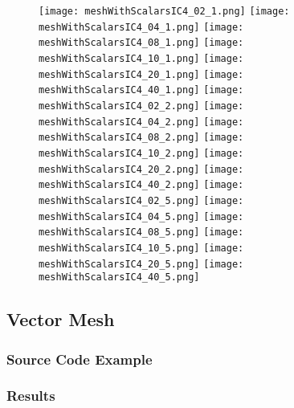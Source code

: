 \documentclass{InsightArticle}
\begin{document}
\begin{figure}
\center
\texttt{[image: meshWithScalarsIC4\_02\_1.png]}
\texttt{[image: meshWithScalarsIC4\_04\_1.png]}
\texttt{[image: meshWithScalarsIC4\_08\_1.png]}
\texttt{[image: meshWithScalarsIC4\_10\_1.png]}
\texttt{[image: meshWithScalarsIC4\_20\_1.png]}
\texttt{[image: meshWithScalarsIC4\_40\_1.png]}
\texttt{[image: meshWithScalarsIC4\_02\_2.png]}
\texttt{[image: meshWithScalarsIC4\_04\_2.png]}
\texttt{[image: meshWithScalarsIC4\_08\_2.png]}
\texttt{[image: meshWithScalarsIC4\_10\_2.png]}
\texttt{[image: meshWithScalarsIC4\_20\_2.png]}
\texttt{[image: meshWithScalarsIC4\_40\_2.png]}
\texttt{[image: meshWithScalarsIC4\_02\_5.png]}
\texttt{[image: meshWithScalarsIC4\_04\_5.png]}
\texttt{[image: meshWithScalarsIC4\_08\_5.png]}
\texttt{[image: meshWithScalarsIC4\_10\_5.png]}
\texttt{[image: meshWithScalarsIC4\_20\_5.png]}
\texttt{[image: meshWithScalarsIC4\_40\_5.png]}
\label{fig:ScalarIC4Smoothings}
\end{figure}

\clearpage

\subsection{Vector Mesh}

\subsubsection{Source Code Example}

\subsubsection{Results}



%
%



\end{document}
